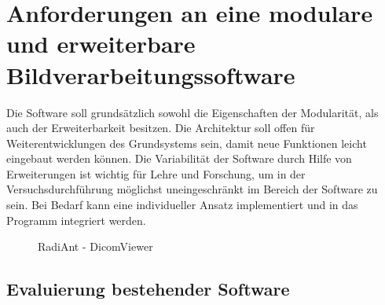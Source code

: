 \chapter{Anforderungen an eine modulare und erweiterbare Bildverarbeitungssoftware}\label{anforderungen}


Die Software soll grundsätzlich sowohl die Eigenschaften der Modularität, als auch der Erweiterbarkeit besitzen. Die Architektur soll offen für Weiterentwicklungen des Grundsystems sein, damit neue Funktionen leicht eingebaut werden können. Die Variabilität der Software durch Hilfe von Erweiterungen ist wichtig für Lehre und Forschung, um in der Versuchsdurchführung möglichst uneingeschränkt im Bereich der Software zu sein. Bei Bedarf kann eine individueller Ansatz implementiert und in das Programm integriert werden.\\
       
\begin{figure}[htbp]
  \vspace{0.5cm}
  \centering
   \caption{RadiAnt - DicomViewer}
  \label{radiant}
  \vspace{0.5cm}
\end{figure}



\section{Evaluierung bestehender Software}


